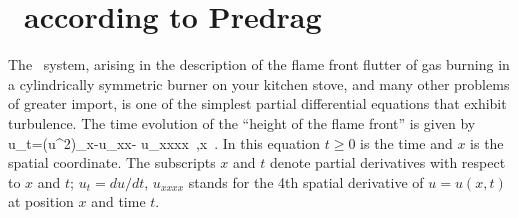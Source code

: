 
\section{\KSe\ according to Predrag}
\label{s-KS}


The \KS\ system,
arising in the description of the flame front flutter of  gas burning in
a cylindrically symmetric burner on your kitchen stove,
and many other problems of greater import,
is one of the simplest partial differential equations that
exhibit turbulence.
The time evolution of the ``height of the flame front'' 
is given by
\beq
u_t=(u^2)_x-u_{xx}- u_{xxxx}
\,,\qquad	x \in [0,L]
\,.
In this equation $t \geq 0$ is the time and
$x$ is the spatial coordinate.
The subscripts $x$ and $t$ denote partial derivatives with respect to
$x$ and $t$;
$u_t = du/dt$, $u_{xxxx}$ stands for the 4th spatial
derivative of 
$u=u(x,t)$ at position $x$ and time $t$.



